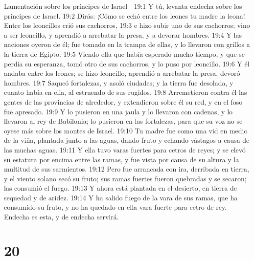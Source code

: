 Lamentación sobre los príncipes de Israel  

19:1 Y tú, levanta endecha sobre los príncipes de Israel.  
19:2 Dirás: ¡Cómo se echó entre los leones tu madre la leona! Entre los leoncillos crió sus cachorros,  
19:3 e hizo subir uno de sus cachorros; vino a ser leoncillo, y aprendió a arrebatar la presa, y a devorar hombres.  
19:4 Y las naciones oyeron de él; fue tomado en la trampa de ellas, y lo llevaron con grillos a la tierra de Egipto.  
19:5 Viendo ella que había esperado mucho tiempo, y que se perdía su esperanza, tomó otro de sus cachorros, y lo puso por leoncillo.  
19:6 Y él andaba entre los leones; se hizo leoncillo, aprendió a arrebatar la presa, devoró hombres.  
19:7 Saqueó fortalezas, y asoló ciudades; y la tierra fue desolada, y cuanto había en ella, al estruendo de sus rugidos.  
19:8 Arremetieron contra él las gentes de las provincias de alrededor, y extendieron sobre él su red, y en el foso fue apresado.  
19:9 Y lo pusieron en una jaula y lo llevaron con cadenas, y lo llevaron al rey de Babilonia; lo pusieron en las fortalezas, para que su voz no se oyese más sobre los montes de Israel.  
19:10 Tu madre fue como una vid en medio de la viña, plantada junto a las aguas, dando fruto y echando vástagos a causa de las muchas aguas.  
19:11 Y ella tuvo varas fuertes para cetros de reyes; y se elevó su estatura por encima entre las ramas, y fue vista por causa de su altura y la multitud de sus sarmientos.  
19:12 Pero fue arrancada con ira, derribada en tierra, y el viento solano secó su fruto; sus ramas fuertes fueron quebradas y se secaron; las consumió el fuego.  
19:13 Y ahora está plantada en el desierto, en tierra de sequedad y de aridez.  
19:14 Y ha salido fuego de la vara de sus ramas, que ha consumido su fruto, y no ha quedado en ella vara fuerte para cetro de rey. Endecha es esta, y de endecha servirá.  

\chapter{20}

